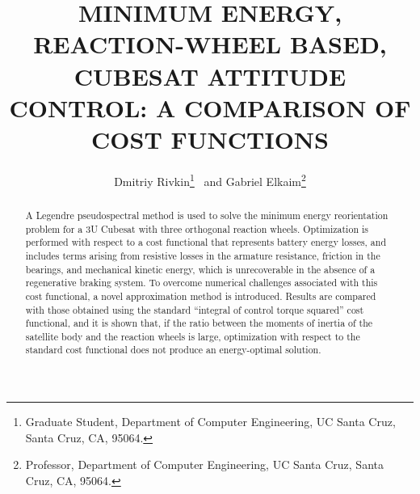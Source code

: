 \documentclass[letterpaper, paper,11pt]{AAS}
\begin{document}
\title{MINIMUM ENERGY, REACTION-WHEEL BASED, CUBESAT ATTITUDE CONTROL: A COMPARISON OF COST FUNCTIONS}

\author{Dmitriy Rivkin\thanks{Graduate Student, Department of Computer Engineering, UC Santa Cruz, Santa Cruz, CA, 95064.}  
\ and Gabriel Elkaim\thanks{Professor, Department of Computer Engineering, UC Santa Cruz, Santa Cruz, CA, 95064.}
}


\maketitle{} 		


\begin{abstract}
A Legendre pseudospectral method is used to solve the minimum energy reorientation problem for a 3U Cubesat with three orthogonal reaction wheels. Optimization is performed with respect to a cost functional that represents battery energy losses, and includes terms arising from resistive losses in the armature resistance, friction in the bearings, and mechanical kinetic energy, which is unrecoverable in the absence of a regenerative braking system. To overcome numerical challenges associated with this cost functional, a novel approximation method is introduced. Results are compared with those obtained using the standard ``integral of control torque squared'' cost functional, and it is shown that, if the ratio between the moments of inertia of the satellite body and the reaction wheels is large, optimization with respect to the standard cost functional does not produce an energy-optimal solution.
\end{abstract}
\end{document}
